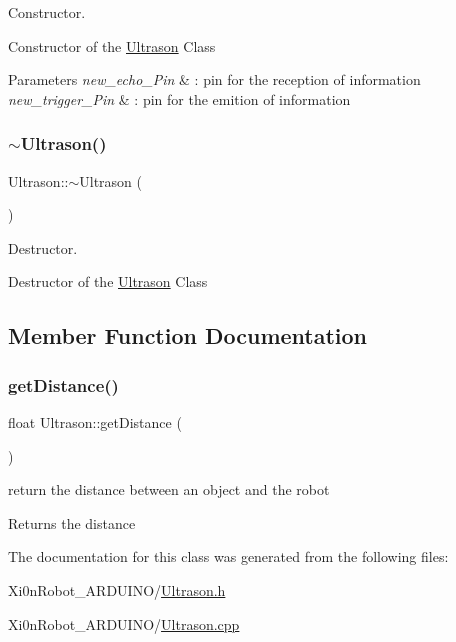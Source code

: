 Constructor. 

Constructor of the \hyperlink{class_ultrason}{Ultrason} Class\textquotesingle{}


\begin{DoxyParams}{Parameters}
{\em new\+\_\+echo\+\_\+\+Pin} & \+: pin for the reception of information \\
\hline
{\em new\+\_\+trigger\+\_\+\+Pin} & \+: pin for the emition of information \\
\hline
\end{DoxyParams}
\mbox{\label{class_ultrason_a9ddfaa75d2d63df4a35bfe2a62a87029}} 
\subsubsection{\texorpdfstring{$\sim$\+Ultrason()}{~Ultrason()}}
{\footnotesize\ttfamily Ultrason\+::$\sim$\+Ultrason (\begin{DoxyParamCaption}{ }\end{DoxyParamCaption})}



Destructor. 

Destructor of the \hyperlink{class_ultrason}{Ultrason} Class\textquotesingle{} 

\subsection{Member Function Documentation}
\mbox{\label{class_ultrason_ae0c4468df36bc49c31e5e8a4eb973e08}} 
\subsubsection{\texorpdfstring{get\+Distance()}{getDistance()}}
{\footnotesize\ttfamily float Ultrason\+::get\+Distance (\begin{DoxyParamCaption}{ }\end{DoxyParamCaption})}



return the distance between an object and the robot 

\begin{DoxyReturn}{Returns}
the distance 
\end{DoxyReturn}


The documentation for this class was generated from the following files\+:\begin{DoxyCompactItemize}
\item 
Xi0n\+Robot\+\_\+\+A\+R\+D\+U\+I\+N\+O/\hyperlink{_ultrason_8h}{Ultrason.\+h}\item 
Xi0n\+Robot\+\_\+\+A\+R\+D\+U\+I\+N\+O/\hyperlink{_ultrason_8cpp}{Ultrason.\+cpp}\end{DoxyCompactItemize}
